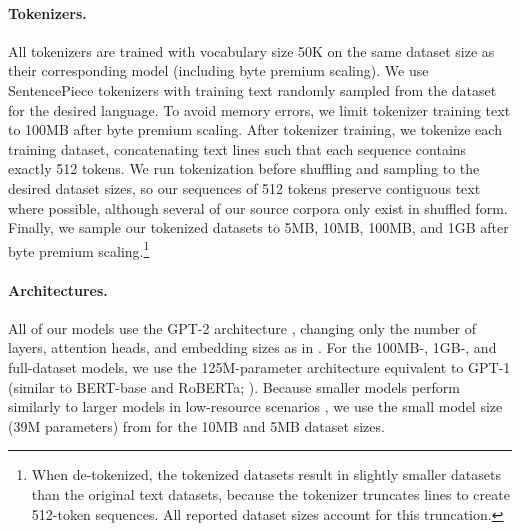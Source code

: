 \documentclass[11pt]{article}
\begin{document}

\paragraph{Tokenizers.}
All tokenizers are trained with vocabulary size 50K \citep{liu-etal-2019-roberta} on the same dataset size as their corresponding model (including byte premium scaling).
We use SentencePiece tokenizers \citep{kudo-richardson-2018-sentencepiece} with training text randomly sampled from the dataset for the desired language.
To avoid memory errors, we limit tokenizer training text to 100MB after byte premium scaling.
After tokenizer training, we tokenize each training dataset, concatenating text lines such that each sequence contains exactly 512 tokens.
We run tokenization before shuffling and sampling to the desired dataset sizes, so our sequences of 512 tokens preserve contiguous text where possible, although several of our source corpora only exist in shuffled form.
Finally, we sample our tokenized datasets to 5MB, 10MB, 100MB, and 1GB after byte premium scaling.\footnote{When de-tokenized, the tokenized datasets result in slightly smaller datasets than the original text datasets, because the tokenizer truncates lines to create 512-token sequences. All reported dataset sizes account for this truncation.}

\paragraph{Architectures.}
All of our models use the GPT-2 architecture \citep{radford-etal-2019-language}, changing only the number of layers, attention heads, and embedding sizes as in \citet{turc2019well}.
For the 100MB-, 1GB-, and full-dataset models, we use the 125M-parameter architecture equivalent to GPT-1 \citep{radford-etal-2018-improving} (similar to BERT-base and RoBERTa; \citealp{devlin-etal-2019-bert,liu-etal-2019-roberta}).
Because smaller models perform similarly to larger models in low-resource scenarios \citep{chang-etal-2023-multilinguality}, we use the small model size (39M parameters) from \citet{turc2019well} for the 10MB and 5MB dataset sizes.
\end{document}
